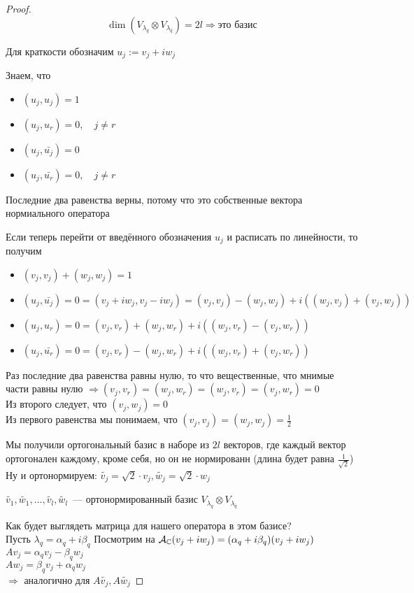 \begin{theorem}
\begin{proof}
    \[ \dim(V_{\lambda_q} \otimes V_{\lambda_{\bar{q}}}) = 2l \Longrightarrow \text{это базис}  \]
    
    Для краткости обозначим $u_j := v_j + iw_j$

    Знаем, что \begin{itemize}
        \item $(u_j, u_j) = 1$
        \item $(u_j, u_r) = 0, \quad j \neq r$
        \item $(u_j, \bar{u_j}) = 0$
        \item $(u_j, \bar{u_r}) = 0, \quad j \neq r$
    \end{itemize}
    Последние два равенства верны, потому что это собственные вектора нормиального оператора

    Если теперь перейти от введённого обозначения $u_j$ и расписать по линейности, то получим
    
    \begin{itemize}
        \item $ (v_j, v_j) + (w_j, w_j) = 1  $
        \item $ (u_j, \bar{u_j}) = 0 = (v_j + iw_j, v_j - iw_j) = (v_j, v_j) - (w_j, w_j) + i ( (w_j, v_j) + (v_j, w_j) )$
        \item $(u_j, u_r) = 0 = (v_j, v_r) + (w_j, w_r) + i ( (w_j, v_r ) - (v_j, w_r) )$
        \item $(u_j, \bar{u_r}) = 0 = (v_j, v_r) - (w_j, w_r) + i ( (w_j, v_r ) + (v_j, w_r) )$
    \end{itemize}
    
    Раз последние два равенства равны нулю, то что вещественные, что мнимые части равны нулю $\Longrightarrow (v_j, v_r) = (w_j, w_r) = (w_j, v_r) = (v_j, w_r) = 0$ \\
    Из второго следует, что $(v_j, w_j) = 0$ \\
    Из первого равенства мы понимаем, что $(v_j, v_j) = (w_j, w_j) = \frac{1}{2}$

    Мы получили ортогональный базис в наборе из $2l$ векторов, где каждый вектор ортогонален каждому, кроме себя, но он не нормированн (длина будет равна $ \frac{1}{\sqrt{2}} $) \\
    Ну и ортонормируем: $\tilde{v_j} = \sqrt{2} \cdot v_j, \tilde{w_j} = \sqrt{2} \cdot w_j$ 


    $ \tilde{v_1}, \tilde{w_1}, \dots, \tilde{v_l}, \tilde{w_l} $~--- ортонормированный базис $V_{\lambda_q} \otimes V_{\lambda_{\bar{q}}}$

    Как будет выглядеть матрица для нашего оператора в этом базисе? \\
    Пусть $\lambda_q = \alpha_q + i \beta_q$
    Посмотрим на $\mathcal{A}_{\mathbb{C}}(v_j + iw_j) = (\alpha_q + i \beta_q) (v_j + iw_j)$ \\
    $Av_j = \alpha_q v_j -  \beta_q w_j$ \\
    $Aw_j = \beta_q v_j + \alpha_q w_j$ \\
    $\Longrightarrow $ аналогично для $A\tilde{v_j}, A\tilde{w_j}$



\end{proof}
\end{theorem}
